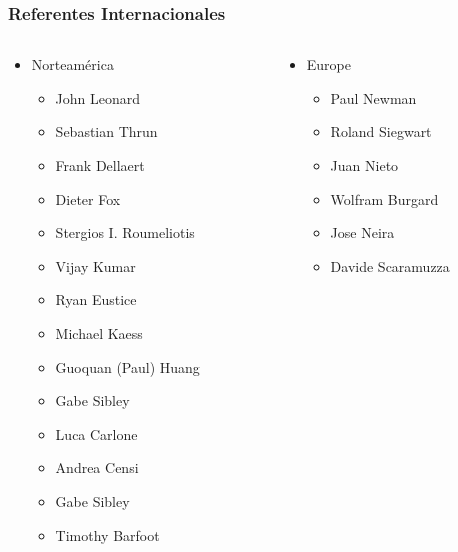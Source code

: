 \begin{frame}
    \frametitle{Referentes Internacionales}
    
    \begin{columns}[T] %
        \begin{column}{.3\textwidth}
            \begin{itemize}
                \item Norteamérica
                \begin{itemize}
                    \item John Leonard
                    \item Sebastian Thrun
                    \item Frank Dellaert
                    \item Dieter Fox
                    \item Stergios I. Roumeliotis
                    \item Vijay Kumar
                    \item Ryan Eustice
                    \item Michael Kaess
                    \item Guoquan (Paul) Huang
                    \item Gabe Sibley
                    \item Luca Carlone
                    \item Andrea Censi
                    \item Gabe Sibley
                    \item Timothy Barfoot
                \end{itemize}
            \end{itemize}
        \end{column}%
        \hfill%
        \begin{column}{.3\textwidth}
            \begin{itemize} 
                \item Europe
                \begin{itemize}     
                    \item Paul Newman
                    \item Roland Siegwart
                    \item Juan Nieto
                    \item Wolfram Burgard
                    \item Jose Neira
                    \item Davide Scaramuzza

\end{itemize}
\end{itemize}
\end{column}
\end{columns}
\end{frame}
